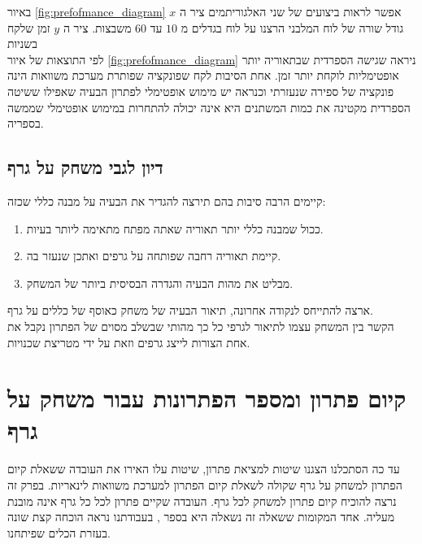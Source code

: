\documentclass[12pt,leqno]{article}
\theoremstyle{theoremdd}
\begin{document}
באיור 
\ref{fig:prefofmance_diagram}
אפשר לראות ביצועים
של שני האלגוריתמים ציר 
ה
$x$
גודל שורה של לוח המלבני
הרצנו על 
לוח בגדלים 
מ
$10$
עד 
$60$
משבצות.
ציר ה
$y$
זמן שלקח 
בשניות
\\
לפי התוצאות של איור 
\ref{fig:prefofmance_diagram}
ניראה 
שגישה הספרדית שבתאוריה יותר אופטימליות לוקחת יותר זמן.
אחת הסיבות לקח 
שפונקציה שפותרת מערכת משוואות הינה פונקציה של ספירה שנעזרתי וכנראה יש מימוש אופטימלי לפתרון הבעיה שאפילו 
ששיטה הספרדית מקטינה את כמות 
המשתנים היא אינה יכולה להתחרות במימוש אופטימלי שממשה בספריה.

\subsection{דיון לגבי משחק על גרף}
קיימים הרבה סיבות בהם תירצה להגדיר את הבעיה על מבנה כללי שכזה:

\begin{enumerate}
    \item 
    ככול שמבנה כללי יותר תאוריה שאתה מפתח מתאימה ליותר בעיות.
    \item 
    קיימת תאוריה רחבה שפותחה על גרפים ואתכן שנעזר בה.
    \item 
    מבליט את מהות הבעיה והגדרה הבסיסית ביותר של המשחק.
\end{enumerate}

ארצה להתייחס לנקודה אחרונה, תיאור הבעיה של משחק
כאוסף של כללים על גרף.
\\
הקשר בין המשחק עצמו לתיאור לגרפי כל כך מהותי
שבשלב מסוים של הפתרון נקבל את אחת הצורות לייצג גרפים וזאת על ידי מטריצת שכנויות.

\newpage
\section{קיום פתרון ומספר הפתרונות עבור משחק על גרף}
עד כה הסתכלנו הצגנו שיטות למציאת פתרון,
שיטות עלו האירו את העובדה
ששאלת קיום הפתרון למשחק על גרף שקולה לשאלת קיום הפתרון למערכת
משוואות לינאריות.
בפרק זה נרצה להוכיח קיום פתרון למשחק לכל גרף.
העובדה שקיים פתרון לכל כל גרף אינה מובנת מעליה.
אחד המקומות ששאלה זה נשאלה היא בספר 
\cite{B3},
בעבודתנו נראה הוכחה קצת שונה בעזרת הכלים שפיתחנו.
\end{document}
